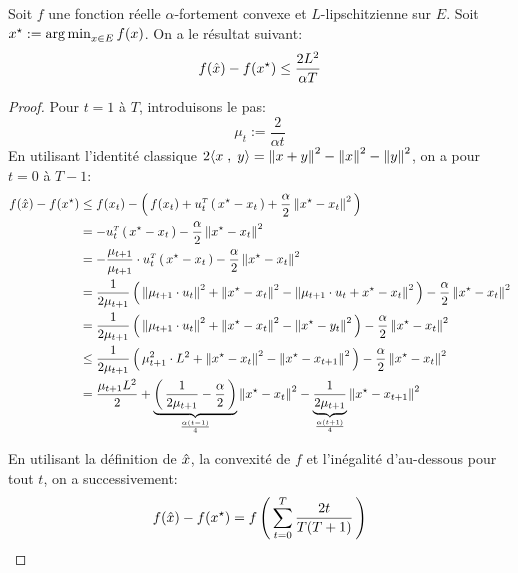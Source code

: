 \begin{theorem}

Soit $f$ une fonction réelle $\alpha$-fortement convexe et $L$-lipschitzienne sur
$E$. Soit $\xopt:= \argmin_{x\in E} f(x)$. On a le résultat suivant:
\begin{equation}
f(\xhat)-f(\xopt) \leq \frac{2 L^2}{\alpha T}
\end{equation}
\end{theorem}

\begin{proof}
Pour $t=1$ à $T$, introduisons le pas:
\begin{equation}
  \mu_t := \frac{2}{\alpha t}
\end{equation}
En utilisant l'identité classique $2\ps{x}{y} = \norme{x+y}^2-\norme{x}^2-\norme{y}^2$, on a pour $t=0$ à $T-1$:
\begin{align*}
f(\xhat)-f(\xopt) &\leq f(x_t)-\prt{f(x_t) + \transpose{u_t}\prt{\xopt-x_t}
+ \frac{\alpha}{2} \norme{\xopt-x_t}^2}\\
&= -\transpose{u_t}\prt{\xopt-x_t}
- \frac{\alpha}{2} \norme{\xopt-x_t}^2\\
&= -\frac{\step}{\step} \cdot \transpose{u_t}\prt{\xopt-x_t}
- \frac{\alpha}{2} \norme{\xopt-x_t}^2\\
&= \frac{1}{2 \step }\prt{\norme{\step \cdot u_t}^2+\norme{\xopt-x_t}^2-\norme{\step \cdot u_t+\xopt-x_t}^2
}- \frac{\alpha}{2} \norme{\xopt-x_t}^2\\
&= \frac{1}{2 \step }\prt{\norme{\step \cdot u_t}^2+\norme{\xopt-x_t}^2-\norme{ \xopt-y_t}^2
}- \frac{\alpha}{2} \norme{\xopt-x_t}^2\\
&\leq  \frac{1}{2 \step }\prt{\step^2\cdot L^2+\norme{\xopt-x_t}^2-\norme{\xopt-x_{t+1}}^2
}- \frac{\alpha}{2} \norme{\xopt-x_t}^2\\
&= \frac{\step L^2}{2} + \underbrace{\prt{\frac{1}{2 \step } - \frac{\alpha}{2}}}_{\frac{\alpha (t-1)}{4}} \norme{\xopt-x_t}^2
- \underbrace{\frac{1}{2 \step }}_{\frac{\alpha (t+1)}{4}} \norme{\xopt-x_{t+1}}^2
\end{align*}

En utilisant la définition de $\hat{x}$, la convexité de $f$ et l'inégalité d'au-dessous pour tout $t$, on a successivement:
\begin{align*}
  f(\xhat)-f(\xopt) = f\prt{\sum_{t=0}^T \frac{2t}{T(T+1)}}
\end{align*}



\end{proof}
